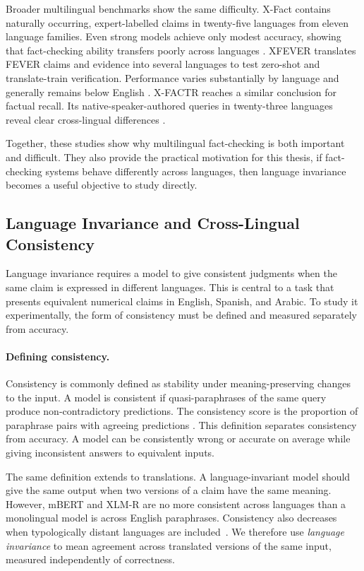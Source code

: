 Broader multilingual benchmarks show the same difficulty. X-Fact contains
naturally occurring, expert-labelled claims in twenty-five languages from eleven
language families. Even strong models achieve only modest accuracy, showing that
fact-checking ability transfers poorly across languages
\cite{gupta2021xfactnewbenchmarkdataset}. XFEVER translates FEVER claims and
evidence into several languages to test zero-shot and translate-train verification.
Performance varies substantially by language and generally remains below English
\cite{chang2023xfeverexploringfactverification}. X-FACTR reaches a similar
conclusion for factual recall. Its native-speaker-authored queries in twenty-three
languages reveal clear cross-lingual differences
\cite{jiang2020xfactrmultilingualfactualknowledge}.

Together, these studies show why multilingual fact-checking is both important and
difficult. They also provide the practical motivation for this thesis, if
fact-checking systems behave differently across languages, then language
invariance becomes a useful objective to study directly.

\subsection{Language Invariance and Cross-Lingual Consistency}
\label{subsec:invariance}

Language invariance requires a model to give consistent judgments when the same
claim is expressed in different languages. This is central to a task that presents
equivalent numerical claims in English, Spanish, and Arabic. To study it
experimentally, the form of consistency must be defined and measured separately
from accuracy.

\paragraph{Defining consistency.}
Consistency is commonly defined as stability under meaning-preserving changes to
the input. A model is consistent if quasi-paraphrases of the same query produce
non-contradictory predictions. The consistency score is the proportion of
paraphrase pairs with agreeing predictions
\cite{elazar2021measuringimprovingconsistencypretrained}. This definition separates
consistency from accuracy. A model can be consistently wrong or accurate on
average while giving inconsistent answers to equivalent inputs.

The same definition extends to translations. A language-invariant model should
give the same output when two versions of a claim have the same meaning. However,
mBERT and XLM-R are no more consistent across languages than a monolingual model
is across English paraphrases. Consistency also decreases when typologically
distant languages are included~\cite{Fierro_2022}. We therefore use
\emph{language invariance} to mean agreement across translated versions of the
same input, measured independently of correctness.

